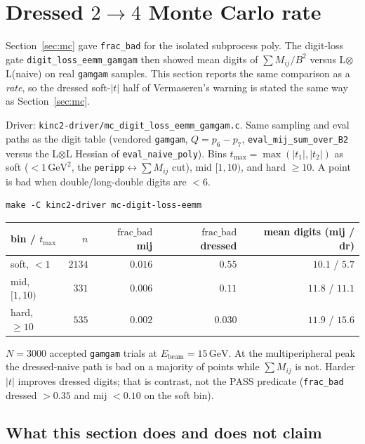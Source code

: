 \documentclass[11pt]{article}
\begin{document}
\section{Dressed $2\to4$ Monte Carlo rate}
\label{sec:mc-eemm}

Section~\ref{sec:mc} gave \texttt{frac\_bad} for the isolated subprocess
poly. The digit-loss gate \texttt{digit\_loss\_eemm\_gamgam} then showed
mean digits of $\sum M_{ij}/B^2$ versus L$\otimes$L(naive) on real
\texttt{gamgam} samples. This section reports the same comparison as a
\emph{rate}, so the dressed soft-$|t|$ half of Vermaseren's warning is
stated the same way as Section~\ref{sec:mc}.

Driver: \texttt{kinc2-driver/mc\_digit\_loss\_eemm\_gamgam.c}. Same
sampling and eval paths as the digit table (vendored \texttt{gamgam},
$Q=p_6-p_7$, \texttt{eval\_mij\_sum\_over\_B2} versus the L$\otimes$L
Hessian of \texttt{eval\_naive\_poly}). Bins
$t_{\max}=\max(|t_1|,|t_2|)$ as soft ($<1\,\mathrm{GeV}^2$, the
\texttt{peripp}$\leftrightarrow\sum M_{ij}$ cut), mid $[1,10)$, and
hard $\ge 10$. A point is bad when double/long-double digits are $<6$.

\begin{verbatim}
make -C kinc2-driver mc-digit-loss-eemm
\end{verbatim}

\begin{center}
\begin{tabular}{@{}lrrrr@{}}
\toprule
bin / $t_{\max}$ & $n$ & $\mathrm{frac\_bad}$ mij &
  $\mathrm{frac\_bad}$ dressed & mean digits (mij / dr) \\
\midrule
soft, $<1$ & $2134$ & $0.016$ & $0.55$ & $10.1$ / $5.7$ \\
mid, $[1,10)$ & $331$ & $0.006$ & $0.11$ & $11.8$ / $11.1$ \\
hard, $\ge 10$ & $535$ & $0.002$ & $0.030$ & $11.9$ / $15.6$ \\
\bottomrule
\end{tabular}
\end{center}

$N=3000$ accepted \texttt{gamgam} trials at $E_{\mathrm{beam}}=15\,\mathrm{GeV}$.
At the multiperipheral peak the dressed-naive path is bad on a majority
of points while $\sum M_{ij}$ is not. Harder $|t|$ improves dressed
digits; that is contrast, not the PASS predicate
(\texttt{frac\_bad} dressed $>0.35$ and mij $<0.10$ on the soft bin).

\subsection{What this section does and does not claim}
\label{sec:mc-eemm-claims}
\end{document}
